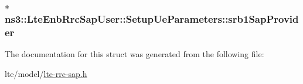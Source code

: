 \subsubsection[{\texorpdfstring{srb1\+Sap\+Provider}{srb1SapProvider}}]{$\ast$ ns3\+::\+Lte\+Enb\+Rrc\+Sap\+User\+::\+Setup\+Ue\+Parameters\+::srb1\+Sap\+Provider}\hypertarget{structns3_1_1LteEnbRrcSapUser_1_1SetupUeParameters_a1b742da9535b4e30eb58c62f32e3ab50}{}\label{structns3_1_1LteEnbRrcSapUser_1_1SetupUeParameters_a1b742da9535b4e30eb58c62f32e3ab50}


The documentation for this struct was generated from the following file\+:\begin{DoxyCompactItemize}
\item 
lte/model/\hyperlink{lte-rrc-sap_8h}{lte-\/rrc-\/sap.\+h}\end{DoxyCompactItemize}
